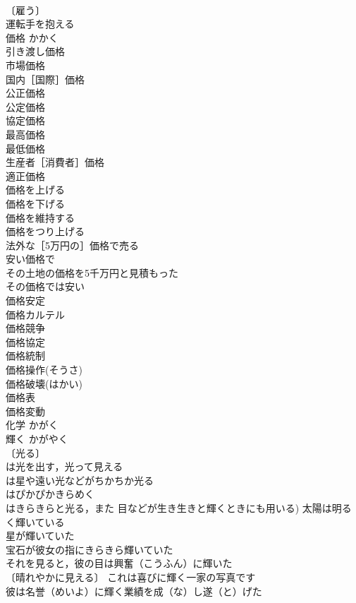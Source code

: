 \documentclass[8pt]{extreport}
\begin{document}
\begin{CJK}{UTF8}{min}
\\	〔雇う〕 
\\	運転手を抱える 
\\	価格	かかく	
\\	引き渡し価格 
\\	市場価格 
\\	国内［国際］価格 
\\	公正価格 
\\	公定価格 
\\	協定価格 
\\	最高価格 
\\	最低価格 
\\	生産者［消費者］価格 
\\	適正価格 
\\	価格を上げる 
\\	価格を下げる 
\\	価格を維持する 
\\	価格をつり上げる 
\\	法外な［5万円の］価格で売る 
\\	安い価格で 
\\	その土地の価格を5千万円と見積もった 
\\	その価格では安い 
\\	価格安定 
\\	価格カルテル 
\\	価格競争 
\\	価格協定 
\\	価格統制 
\\	価格操作(そうさ) 
\\	価格破壊(はかい) 
\\	価格表 
\\	価格変動 
\\	化学	かがく	
\\	輝く	かがやく	
\\	〔光る〕
\\	は光を出す，光って見える
\\	は星や遠い光などがちかちか光る
\\	はぴかぴかきらめく
\\	はきらきらと光る，また 目などが生き生きと輝くときにも用いる) 太陽は明るく輝いている 
\\	星が輝いていた 
\\	宝石が彼女の指にきらきら輝いていた 
\\	それを見ると，彼の目は興奮（こうふん）に輝いた 
\\	〔晴れやかに見える〕 これは喜びに輝く一家の写真です 
\\	彼は名誉（めいよ）に輝く業績を成（な）し遂（と）げた 

\end{CJK}
\end{document}

